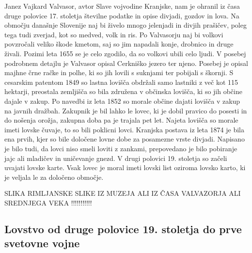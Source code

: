 \documentclass[a4paper,12pt,openright]{book}
\begin{document}
Janez Vajkard Valvasor, avtor Slave vojvodine Kranjske, nam je ohranil iz časa druge polovice 17. stoletja številne podatke in opise divjadi, gozdov in lova. 
Na območju današnje Slovenije naj bi živelo mnogo jelenjadi in divjih prašičev, poleg tega tudi zverjad, kot so medved, volk in ris. Po Valvasorju naj bi volkovi povzročali veliko škode kmetom, saj so jim napadali konje, drobnico in druge živali. 
Pozimi leta 1655 se je celo zgodilo, da so volkovi ubili celo ljudi. V posebej podrobnem detajlu je Valvasor opisal Cerkniško jezero ter njeno. 
Posebej je opisal  majhne črne račke in polhe, ki so jih lovili s suknjami ter pobijali s škornji.
S cesarskim patentom 1849 so lastna lovišča obdržali samo lastniki z več kot 115 hektarji, preostala zemljišča so bila združena v občinska lovišča, ki so jih občine dajale v zakup.
Po navedbi iz leta 1852 so morale občine dajati lovišča v zakup na javnih dražbah. 
Zakupnik je bil lahko le lovec, ki je dobil pravico do posesti in do nošenja orožja, zakupna doba pa je trajala pet let.
Najeta lovišča so morale imeti lovske čuvaje, to so bili poklicni lovci.
Kranjska postava iz leta 1874 je bila ena prvih, kjer so bile določene lovne dobe za posamezne vrste divjadi.
Napisano je bilo tudi, da lovci niso smeli loviti z zankami, prepovedano je bilo pobiranje jajc ali mladičev in uničevanje gnezd.
V drugi polovici 19. stoletja so začeli uvajati lovske karte.
Vsak lovec je moral imeti lovski list oziroma lovsko karto, ki je veljala le za določeno območje.\cite{Lov_43_55}

SLIKA RIMLJANSKE SLIKE IZ MUZEJA ALI IZ ČASA VALVAZORJA ALI SREDNJEGA VEKA !!!!!!!!!!!

\subsection{Lovstvo od druge polovice 19. stoletja do prve svetovne vojne}
\end{document}
